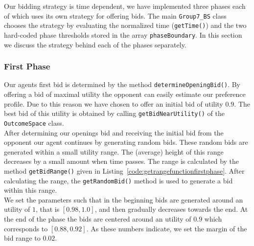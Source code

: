 Our bidding strategy is time dependent, we have implemented three phases each of which uses its own strategy for offering bids. The main \texttt{Group7\_BS} class chooses the strategy by evaluating the normalized time (\texttt{getTime()}) and the two hard-coded phase thresholds stored in the array \texttt{phaseBoundary}. In this section we discuss the strategy behind each of the phases separately.

\subsubsection{First Phase}
Our agents first bid is determined by the method \texttt{determineOpeningBid()}. By offering a bid of maximal utility the opponent can easily estimate our preference profile. Due to this reason we have chosen to offer an initial bid of utility $0.9$. The best bid of this utility is obtained by calling \texttt{getBidNearUtility()} of the \texttt{OutcomeSpace} class. \\

After determining our openings bid and receiving the initial bid from the opponent our agent continues by generating random bids. These random bids are generated within a small utility range. The (average) height of this range decreases by a small amount when time passes. The range is calculated by the method \texttt{getBidRange()} given in Listing~\ref{code:getrangefunctionfirstphase}. After calculating the range, the \texttt{getRandomBid()} method is used to generate a bid within this range. \\

We set the parameters such that in the beginning bids are generated around an utility of $1$, that is $[0.98, 1.0]$, and then gradually decreases towards the end. At the end of the phase the bids are centered around an utility of $0.9$ which corresponds to $[0.88, 0.92]$. As these numbers indicate, we set the margin of the bid range to $0.02$. 

\clearpage

